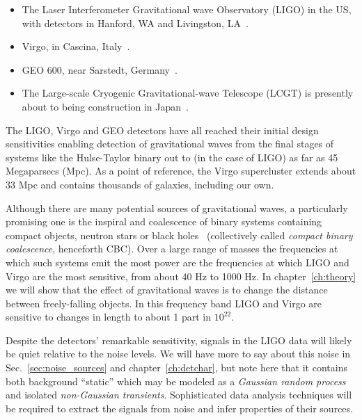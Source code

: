 \begin{itemize}

\item The Laser Interferometer Gravitational wave Observatory (LIGO)
in the US, with detectors in Hanford, WA and Livingston,
LA~\cite{Sigg:2008}.

\item Virgo, in Cascina, Italy~\cite{Acernese:2008}.

\item GEO 600, near Sarstedt, Germany~\cite{Grote:2008}.

\item The Large-scale Cryogenic Gravitational-wave Telescope (LCGT) is
presently about to being construction in
Japan~\cite{0264-9381-27-8-084004}.
\end{itemize}

The LIGO, Virgo and GEO detectors have all reached their initial
design sensitivities enabling detection of gravitational waves from
the final stages of systems like the Hulse-Taylor binary out to (in
the case of LIGO) as far as 45 Megaparsecs (Mpc).  As a point of
reference, the Virgo supercluster extends about 33 Mpc and contains
thousands of galaxies, including our own.

Although there are many potential sources of gravitational waves, a
particularly promising one is the inspiral and coalescence of binary
systems containing compact objects, neutron stars or black
holes~\cite{thorne.k:1987} (collectively called \emph{compact binary
coalescence}, henceforth CBC).  Over a large range of masses the
frequencies at which such systems emit the most power are the
frequencies at which LIGO and Virgo are the most sensitive, from about
40 Hz to 1000 Hz.  In chapter~\ref{ch:theory} we will show that the
effect of gravitational waves is to change the distance between
freely-falling objects.  In this frequency band LIGO and Virgo are
sensitive to changes in length to about 1 part in $10^{22}$.

Despite the detectors' remarkable sensitivity, signals in the LIGO
data will likely be quiet relative to the noise levels.  We will have
more to say about this noise in Sec.~\ref{sec:noise_sources} and
chapter~\ref{ch:detchar}, but note here that it contains both
background ``static'' which may be modeled as a \emph{Gaussian random
process} and isolated \emph{non-Gaussian transients}.  Sophisticated
data analysis techniques will be required to extract the signals from
noise and infer properties of their sources.

